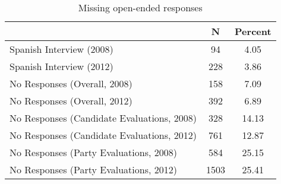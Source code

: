 \begin{table}[ht]
\centering
\begin{tabular}{lcc}
  \hline
 & N & Percent \\ 
  \hline
Spanish Interview (2008) & 94 & 4.05 \\ 
  Spanish Interview (2012) & 228 & 3.86 \\ 
  No Responses (Overall, 2008) & 158 & 7.09 \\ 
  No Responses (Overall, 2012) & 392 & 6.89 \\ 
  No Responses (Candidate Evaluations, 2008) & 328 & 14.13 \\ 
  No Responses (Candidate Evaluations, 2012) & 761 & 12.87 \\ 
  No Responses (Party Evaluations, 2008) & 584 & 25.15 \\ 
  No Responses (Party Evaluations, 2012) & 1503 & 25.41 \\ 
   \hline
\end{tabular}
\caption{Missing open-ended responses} 
\label{tab:appB1mis}
\end{table}
